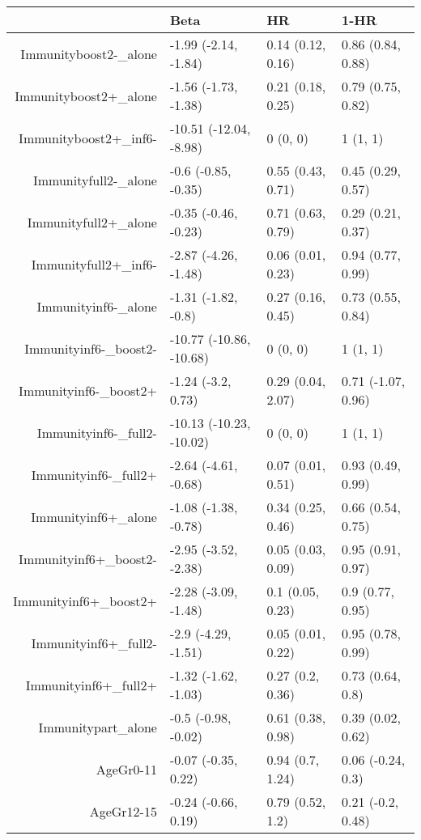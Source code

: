 \begin{table}[ht]
\centering
\begin{tabular}{rlll}
  \hline
 & Beta & HR & 1-HR \\ 
  \hline
Immunityboost2-\_alone & -1.99 (-2.14, -1.84) & 0.14 (0.12, 0.16) & 0.86 (0.84, 0.88) \\ 
  Immunityboost2+\_alone & -1.56 (-1.73, -1.38) & 0.21 (0.18, 0.25) & 0.79 (0.75, 0.82) \\ 
  Immunityboost2+\_inf6- & -10.51 (-12.04, -8.98) & 0 (0, 0) & 1 (1, 1) \\ 
  Immunityfull2-\_alone & -0.6 (-0.85, -0.35) & 0.55 (0.43, 0.71) & 0.45 (0.29, 0.57) \\ 
  Immunityfull2+\_alone & -0.35 (-0.46, -0.23) & 0.71 (0.63, 0.79) & 0.29 (0.21, 0.37) \\ 
  Immunityfull2+\_inf6- & -2.87 (-4.26, -1.48) & 0.06 (0.01, 0.23) & 0.94 (0.77, 0.99) \\ 
  Immunityinf6-\_alone & -1.31 (-1.82, -0.8) & 0.27 (0.16, 0.45) & 0.73 (0.55, 0.84) \\ 
  Immunityinf6-\_boost2- & -10.77 (-10.86, -10.68) & 0 (0, 0) & 1 (1, 1) \\ 
  Immunityinf6-\_boost2+ & -1.24 (-3.2, 0.73) & 0.29 (0.04, 2.07) & 0.71 (-1.07, 0.96) \\ 
  Immunityinf6-\_full2- & -10.13 (-10.23, -10.02) & 0 (0, 0) & 1 (1, 1) \\ 
  Immunityinf6-\_full2+ & -2.64 (-4.61, -0.68) & 0.07 (0.01, 0.51) & 0.93 (0.49, 0.99) \\ 
  Immunityinf6+\_alone & -1.08 (-1.38, -0.78) & 0.34 (0.25, 0.46) & 0.66 (0.54, 0.75) \\ 
  Immunityinf6+\_boost2- & -2.95 (-3.52, -2.38) & 0.05 (0.03, 0.09) & 0.95 (0.91, 0.97) \\ 
  Immunityinf6+\_boost2+ & -2.28 (-3.09, -1.48) & 0.1 (0.05, 0.23) & 0.9 (0.77, 0.95) \\ 
  Immunityinf6+\_full2- & -2.9 (-4.29, -1.51) & 0.05 (0.01, 0.22) & 0.95 (0.78, 0.99) \\ 
  Immunityinf6+\_full2+ & -1.32 (-1.62, -1.03) & 0.27 (0.2, 0.36) & 0.73 (0.64, 0.8) \\ 
  Immunitypart\_alone & -0.5 (-0.98, -0.02) & 0.61 (0.38, 0.98) & 0.39 (0.02, 0.62) \\ 
  AgeGr0-11 & -0.07 (-0.35, 0.22) & 0.94 (0.7, 1.24) & 0.06 (-0.24, 0.3) \\ 
  AgeGr12-15 & -0.24 (-0.66, 0.19) & 0.79 (0.52, 1.2) & 0.21 (-0.2, 0.48) \\ 

\end{tabular}
\end{table}
